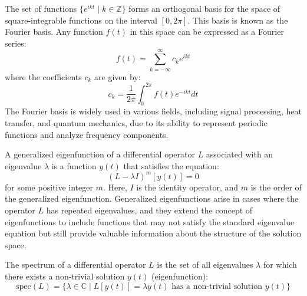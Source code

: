 \documentclass[11pt]{article}
\begin{document}
\begin{definition}
    The set of functions \( \{ e^{ikt} \mid k \in \mathbb{Z} \} \) forms an orthogonal basis for the space of square-integrable functions on the interval \( [0, 2\pi] \). This basis is known as the Fourier basis. Any function \( f(t) \) in this space can be expressed as a Fourier series:
    \begin{equation}
    f(t) = \sum_{k=-\infty}^{\infty} c_k e^{ikt}
    \end{equation}
    where the coefficients \( c_k \) are given by:
    \begin{equation}
    c_k = \frac{1}{2\pi} \int_0^{2\pi} f(t) e^{-ikt} dt
    \end{equation}
    The Fourier basis is widely used in various fields, including signal processing, heat transfer, and quantum mechanics, due to its ability to represent periodic functions and analyze frequency components.
    
\end{definition}

\begin{definition}
    A generalized eigenfunction of a differential operator \( L \) associated with an eigenvalue \( \lambda \) is a function \( y(t) \) that satisfies the equation:
    \begin{equation}
    (L - \lambda I)^m[y(t)] = 0
    \end{equation}
    for some positive integer \( m \). Here, \( I \) is the identity operator, and \( m \) is the order of the generalized eigenfunction. Generalized eigenfunctions arise in cases where the operator \( L \) has repeated eigenvalues, and they extend the concept of eigenfunctions to include functions that may not satisfy the standard eigenvalue equation but still provide valuable information about the structure of the solution space.
    
\end{definition}

\begin{definition}[Spectrum]
    The spectrum of a differential operator \( L \) is the set of all eigenvalues \( \lambda \) for which there exists a non-trivial solution \( y(t) \) (eigenfunction):
    \begin{equation}
        \mathrm{spec}(L) = \{ \lambda \in \mathbb{C} \mid L[y(t)] = \lambda y(t) \text{ has a non-trivial solution } y(t) \}
    \end{equation}
\end{definition}
\end{document}
